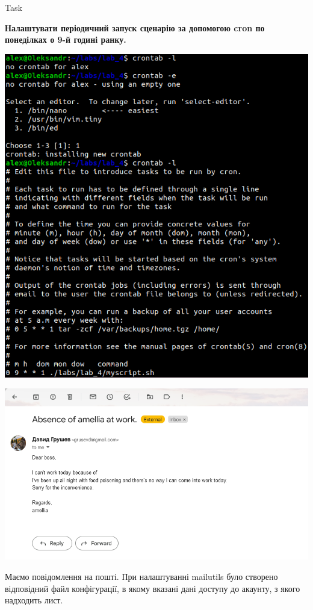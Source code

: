 \documentclass[a4paper,12pt]{article}
\newcommand{\RomanNumeralCaps}[1]{\MakeUppercase{\romannumeral #1}}
\begin{document}
\newpage
    \begin{center}
        \Large{Task \RomanNumeralCaps{2}}
    \end{center}
    \textbf{Налаштувати періодичний запуск сценарію за допомогою cron по понеділках о 9-й годині ранку.} \\
    \begin{minipage}[h]{1\linewidth}
        \centering
        \includegraphics[width=0.7\linewidth]{Prt sc/Figure_4.png}  
    \end{minipage}
    \begin{minipage}[h]{1\linewidth}
        \centering
        \includegraphics[width=0.9\linewidth]{Prt sc/Figure_5.png}  
    \end{minipage}
    Маємо повідомлення на пошті. При налаштуванні mailutils було створено відповідний файл конфігурації, в якому вказані дані доступу до акаунту, з якого надходить лист.
\end{document}
